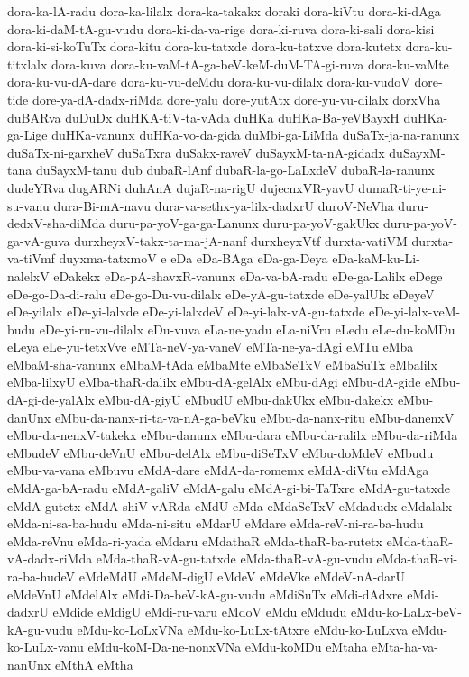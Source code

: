{dora-ka-lA-radu
dora-ka-lilalx
dora-ka-takakx
doraki
dora-kiVtu
dora-ki-dAga
dora-ki-daM-tA-gu-vudu
dora-ki-da-va-rige
dora-ki-ruva
dora-ki-sali
dora-kisi
dora-ki-si-koTuTx
dora-kitu
dora-ku-tatxde
dora-ku-tatxve
dora-kutetx
dora-ku-titxlalx
dora-kuva
dora-ku-vaM-tA-ga-beV-keM-duM-TA-gi-ruva
dora-ku-vaMte
dora-ku-vu-dA-dare
dora-ku-vu-deMdu
dora-ku-vu-dilalx
dora-ku-vudoV
dore-tide
dore-ya-dA-dadx-riMda
dore-yalu
dore-yutAtx
dore-yu-vu-dilalx
dorxVha
duBARva
duDuDx
duHKA-tiV-ta-vAda
duHKa
duHKa-Ba-yeVBayxH
duHKa-ga-Lige
duHKa-vanunx
duHKa-vo-da-gida
duMbi-ga-LiMda
duSaTx-ja-na-ranunx
duSaTx-ni-garxheV
duSaTxra
duSakx-raveV
duSayxM-ta-nA-gidadx
duSayxM-tana
duSayxM-tanu
dub
dubaR-lAnf
dubaR-la-go-LaLxdeV
dubaR-la-ranunx
dudeYRva
dugARNi
duhAnA
dujaR-na-rigU
dujecnxVR-yavU
dumaR-ti-ye-ni-su-vanu
dura-Bi-mA-navu
dura-va-sethx-ya-lilx-dadxrU
duroV-NeVha
duru-dedxV-sha-diMda
duru-pa-yoV-ga-ga-Lanunx
duru-pa-yoV-gakUkx
duru-pa-yoV-ga-vA-guva
durxheyxV-takx-ta-ma-jA-nanf
durxheyxVtf
durxta-vatiVM
durxta-va-tiVmf
duyxma-tatxmoV
e
eDa
eDa-BAga
eDa-ga-Deya
eDa-kaM-ku-Li-nalelxV
eDakekx
eDa-pA-shavxR-vanunx
eDa-va-bA-radu
eDe-ga-Lalilx
eDege
eDe-go-Da-di-ralu
eDe-go-Du-vu-dilalx
eDe-yA-gu-tatxde
eDe-yalUlx
eDeyeV
eDe-yilalx
eDe-yi-lalxde
eDe-yi-lalxdeV
eDe-yi-lalx-vA-gu-tatxde
eDe-yi-lalx-veM-budu
eDe-yi-ru-vu-dilalx
eDu-vuva
eLa-ne-yadu
eLa-niVru
eLedu
eLe-du-koMDu
eLeya
eLe-yu-tetxVve
eMTa-neV-ya-vaneV
eMTa-ne-ya-dAgi
eMTu
eMba
eMbaM-sha-vanunx
eMbaM-tAda
eMbaMte
eMbaSeTxV
eMbaSuTx
eMbalilx
eMba-lilxyU
eMba-thaR-dalilx
eMbu-dA-gelAlx
eMbu-dAgi
eMbu-dA-gide
eMbu-dA-gi-de-yalAlx
eMbu-dA-giyU
eMbudU
eMbu-dakUkx
eMbu-dakekx
eMbu-danUnx
eMbu-da-nanx-ri-ta-va-nA-ga-beVku
eMbu-da-nanx-ritu
eMbu-danenxV
eMbu-da-nenxV-takekx
eMbu-danunx
eMbu-dara
eMbu-da-ralilx
eMbu-da-riMda
eMbudeV
eMbu-deVnU
eMbu-delAlx
eMbu-diSeTxV
eMbu-doMdeV
eMbudu
eMbu-va-vana
eMbuvu
eMdA-dare
eMdA-da-romemx
eMdA-diVtu
eMdAga
eMdA-ga-bA-radu
eMdA-galiV
eMdA-galu
eMdA-gi-bi-TaTxre
eMdA-gu-tatxde
eMdA-gutetx
eMdA-shiV-vARda
eMdU
eMda
eMdaSeTxV
eMdadudx
eMdalalx
eMda-ni-sa-ba-hudu
eMda-ni-situ
eMdarU
eMdare
eMda-reV-ni-ra-ba-hudu
eMda-reVnu
eMda-ri-yada
eMdaru
eMdathaR
eMda-thaR-ba-rutetx
eMda-thaR-vA-dadx-riMda
eMda-thaR-vA-gu-tatxde
eMda-thaR-vA-gu-vudu
eMda-thaR-vi-ra-ba-hudeV
eMdeMdU
eMdeM-digU
eMdeV
eMdeVke
eMdeV-nA-darU
eMdeVnU
eMdelAlx
eMdi-Da-beV-kA-gu-vudu
eMdiSuTx
eMdi-dAdxre
eMdi-dadxrU
eMdide
eMdigU
eMdi-ru-varu
eMdoV
eMdu
eMdudu
eMdu-ko-LaLx-beV-kA-gu-vudu
eMdu-ko-LoLxVNa
eMdu-ko-LuLx-tAtxre
eMdu-ko-LuLxva
eMdu-ko-LuLx-vanu
eMdu-koM-Da-ne-nonxVNa
eMdu-koMDu
eMtaha
eMta-ha-va-nanUnx
eMthA
eMtha
}
